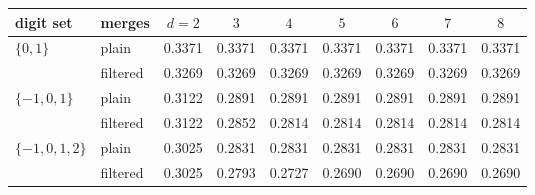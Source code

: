 \begin{tabular}{llccccccc}
\toprule
digit set & merges & $d=2$ & $3$ & $4$ & $5$ & $6$ & $7$ & $8$ \\
\midrule
$\{0,1\}$ & plain & 0.3371 & 0.3371 & 0.3371 & 0.3371 & 0.3371 & 0.3371 & 0.3371 \\
 & filtered & 0.3269 & 0.3269 & 0.3269 & 0.3269 & 0.3269 & 0.3269 & 0.3269 \\
\midrule
$\{-1,0,1\}$ & plain & 0.3122 & 0.2891 & 0.2891 & 0.2891 & 0.2891 & 0.2891 & 0.2891 \\
 & filtered & 0.3122 & 0.2852 & 0.2814 & 0.2814 & 0.2814 & 0.2814 & 0.2814 \\
\midrule
$\{-1,0,1,2\}$ & plain & 0.3025 & 0.2831 & 0.2831 & 0.2831 & 0.2831 & 0.2831 & 0.2831 \\
 & filtered & 0.3025 & 0.2793 & 0.2727 & 0.2690 & 0.2690 & 0.2690 & 0.2690 \\
\bottomrule
\end{tabular}
